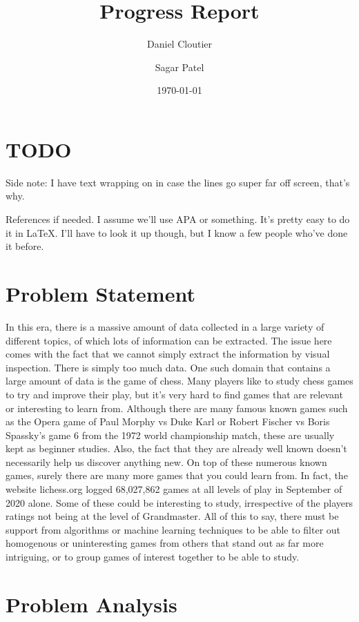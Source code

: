 \documentclass[12pt]{article}
\title{Progress Report}
\author{Daniel Cloutier \and Sagar Patel}
\date{\today}
\begin{document}
    \begin{singlespace}
        \maketitle 
    \end{singlespace}

    \section{TODO}
    Side note: I have text wrapping on in case the lines go super far off screen, that's why.

    References if needed. I assume we'll use APA or something. It's pretty easy to do it in LaTeX. I'll have to look it up though, but I know a few people who've done it before.

    \section{Problem Statement}

    In this era, there is a massive amount of data collected in a large variety of different topics, of which lots of information can be extracted. The issue here comes with the fact that we cannot simply extract the information by visual inspection. There is simply too much data. One such domain that contains a large amount of data is the game of chess. Many players like to study chess games to try and improve their play, but it's very hard to find games that are relevant or interesting to learn from. Although there are many famous known games such as the Opera game of Paul Morphy vs Duke Karl or Robert Fischer vs Boris Spassky's game 6 from the 1972 world championship match, these are usually kept as beginner studies. Also, the fact that they are already well known doesn't necessarily help us discover anything new. On top of these numerous known games, surely there are many more games that you could learn from. In fact, the website lichess.org logged 68,027,862 games at all levels of play in September of 2020 alone. Some of these could be interesting to study, irrespective of the players ratings not being at the level of Grandmaster. All of this to say, there must be support from algorithms or machine learning techniques to be able to filter out homogenous or uninteresting games from others that stand out as far more intriguing, or to group games of interest together to be able to study.

    \section{Problem Analysis}
\end{document}
